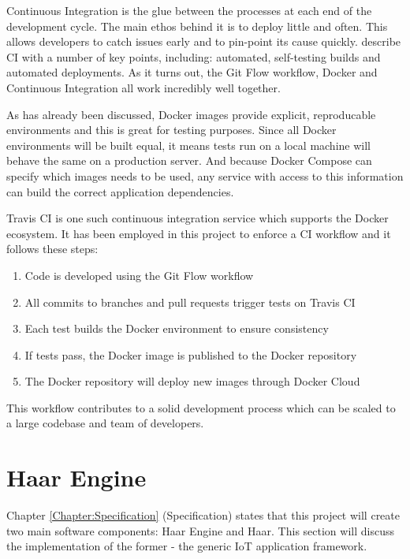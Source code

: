       Continuous Integration is the glue between the processes at each end of the development cycle. The main ethos behind it is to deploy little and often. This allows developers to catch issues early and to pin-point its cause quickly. \citet{continuous-integration} describe CI with a number of key points, including: automated, self-testing builds and automated deployments. As it turns out, the Git Flow workflow, Docker and Continuous Integration all work incredibly well together.

      As has already been discussed, Docker images provide explicit, reproducable environments and this is great for testing purposes. Since all Docker environments will be built equal, it means tests run on a local machine will behave the same on a production server. And because Docker Compose can specify which images needs to be used, any service with access to this information can build the correct application dependencies.

      Travis CI is one such continuous integration service which supports the Docker ecosystem. It has been employed in this project to enforce a CI workflow and it follows these steps:

      \begin{enumerate}
        \item Code is developed using the Git Flow workflow
        \item All commits to branches and pull requests trigger tests on Travis CI
        \item Each test builds the Docker environment to ensure consistency
        \item If tests pass, the Docker image is published to the Docker repository
        \item The Docker repository will deploy new images through Docker Cloud
      \end{enumerate}

      This workflow contributes to a solid development process which can be scaled to a large codebase and team of developers.

  \section{Haar Engine}
    Chapter \ref{Chapter:Specification} (Specification) states that this project will create two main software components: Haar Engine and Haar. This section will discuss the implementation of the former - the generic IoT application framework.

